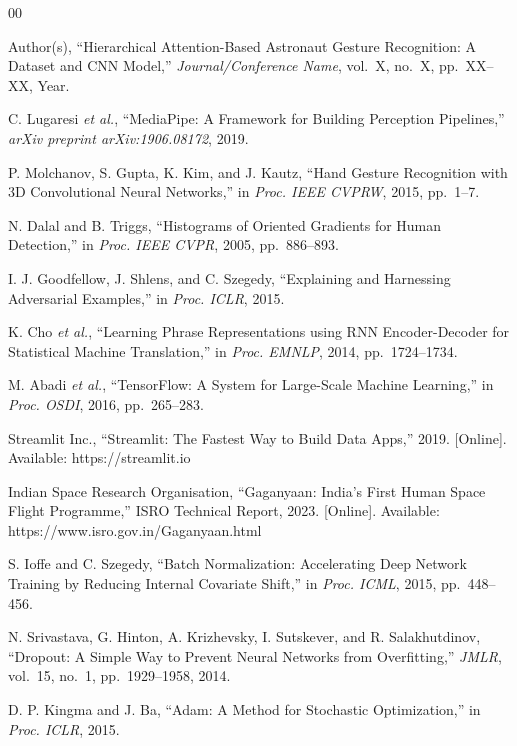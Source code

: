 \documentclass[conference]{IEEEtran}
\begin{document}
\begin{thebibliography}{00}

Author(s), ``Hierarchical Attention-Based Astronaut Gesture Recognition: A Dataset and CNN Model,'' \textit{Journal/Conference Name}, vol.~X, no.~X, pp.~XX--XX, Year.

C. Lugaresi \textit{et al.}, ``MediaPipe: A Framework for Building Perception Pipelines,'' \textit{arXiv preprint arXiv:1906.08172}, 2019.

P. Molchanov, S. Gupta, K. Kim, and J. Kautz, ``Hand Gesture Recognition with 3D Convolutional Neural Networks,'' in \textit{Proc. IEEE CVPRW}, 2015, pp.~1--7.

N. Dalal and B. Triggs, ``Histograms of Oriented Gradients for Human Detection,'' in \textit{Proc. IEEE CVPR}, 2005, pp.~886--893.

I. J. Goodfellow, J. Shlens, and C. Szegedy, ``Explaining and Harnessing Adversarial Examples,'' in \textit{Proc. ICLR}, 2015.

K. Cho \textit{et al.}, ``Learning Phrase Representations using RNN Encoder-Decoder for Statistical Machine Translation,'' in \textit{Proc. EMNLP}, 2014, pp.~1724--1734.

M. Abadi \textit{et al.}, ``TensorFlow: A System for Large-Scale Machine Learning,'' in \textit{Proc. OSDI}, 2016, pp.~265--283.

Streamlit Inc., ``Streamlit: The Fastest Way to Build Data Apps,'' 2019. [Online]. Available: https://streamlit.io

Indian Space Research Organisation, ``Gaganyaan: India's First Human Space Flight Programme,'' ISRO Technical Report, 2023. [Online]. Available: https://www.isro.gov.in/Gaganyaan.html

S. Ioffe and C. Szegedy, ``Batch Normalization: Accelerating Deep Network Training by Reducing Internal Covariate Shift,'' in \textit{Proc. ICML}, 2015, pp.~448--456.

N. Srivastava, G. Hinton, A. Krizhevsky, I. Sutskever, and R. Salakhutdinov, ``Dropout: A Simple Way to Prevent Neural Networks from Overfitting,'' \textit{JMLR}, vol.~15, no.~1, pp.~1929--1958, 2014.

D. P. Kingma and J. Ba, ``Adam: A Method for Stochastic Optimization,'' in \textit{Proc. ICLR}, 2015.

\end{thebibliography}
\end{document}
